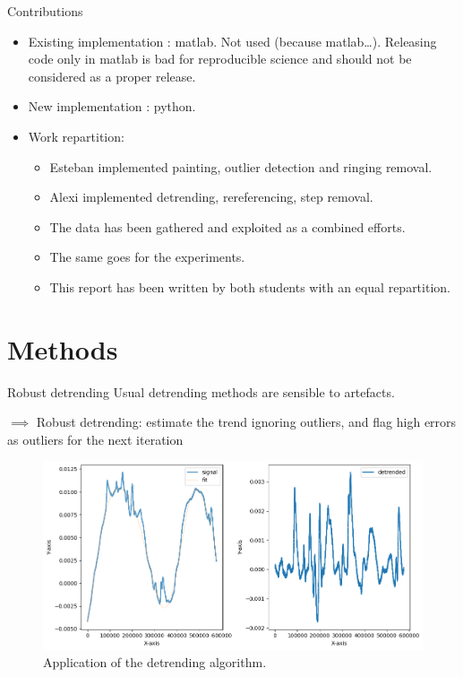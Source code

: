 \documentclass[10pt,serif]{beamer}
\begin{document}
\begin{frame}{Contributions}
    \begin{itemize}
        \setlength{\itemsep}{20pt}
        \item<1->{Existing implementation : matlab. Not used (because matlab\dots). Releasing code only in matlab is bad for reproducible science and should not be considered as a proper release.}
        \item<2->{New implementation : python.}
        \item<3->{Work repartition: \begin{itemize}
            \item Esteban implemented painting, outlier detection and ringing removal.
            \item Alexi implemented detrending, rereferencing, step removal.
            \item The data has been gathered and exploited as a combined efforts.
            \item The same goes for the experiments.
            \item This report has been written by both students with an equal repartition.
        \end{itemize}}
    \end{itemize}
\end{frame}

\section[\color{white} Methods]{Methods}\label{sec:methods}

\begin{frame}{Robust detrending}
    Usual detrending methods are sensible to artefacts.

    $\implies$ Robust detrending: estimate the trend ignoring outliers, and flag high errors as outliers for the next iteration
    \begin{figure}
        \centering
        \includegraphics[width=.8\textwidth]{figures/detrend_real.png}
        \caption{Application of the detrending algorithm.}
        \label{fig:data}
    \end{figure}
\end{frame}
\end{document}
